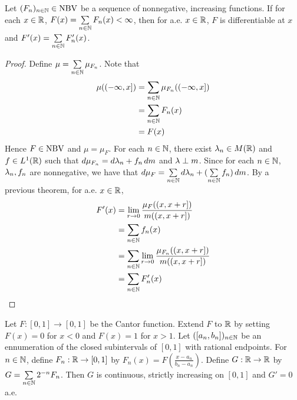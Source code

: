 \documentclass{book}
\begin{document}
	\begin{ex}  
		Let $(F_n)_{n\in \mathbb{N}} \in \text{NBV}$ be a sequence of nonnegative, increasing functions. If for each $x \in \mathbb{R}$, $F(x)=\sum\limits_{n \in \mathbb{N}}F_n(x)< \infty$, then for a.e. $x \in \mathbb{R}$, $F$ is differentiable at $x$ and $F'(x) = \sum\limits_{n\in \mathbb{N}}F_n'(x)$. 
	\end{ex}
	
	\begin{proof}
		
		Define $\mu = \sum\limits_{n \in \mathbb{N}}\mu_{F_n}$. Note that 
		\begin{align*}
			\mu((-\infty,x]) 
			&= \sum\limits_{n \in \mathbb{N}}\mu_{F_n}((-\infty,x]) \\
			&= \sum\limits_{n \in \mathbb{N}}F_n(x)\\
			&= F(x)
		\end{align*}
		Hence $F \in \text{NBV}$ and $\mu=\mu_F$. For each $n \in \mathbb{N}$, there exist $\lambda_n \in M(\mathbb{R})$ and $f \in L^1(\mathbb{R})$ such that $d\mu_{F_n} = d\lambda_n + f_n\, d m$ and $\lambda \perp m$. Since for each $n \in \mathbb{N}$, $\lambda_n, f_n$ are nonnegative, we have that $d\mu_F =  \sum\limits_{n \in \mathbb{N}} d\lambda_n + (\sum\limits_{n \in \mathbb{N}}f_n)\, d m$. By a previous theorem, for a.e. $x \in \mathbb{R}$, 
		\begin{align*}
			F'(x) 
			&= \lim_{r \rightarrow 0}\frac{\mu_F((x,x+r])}{m((x,x+r])} \\
			&= \sum\limits_{n \in \mathbb{N}}f_n(x)\\
			&= \sum\limits_{n \in \mathbb{N}}\lim_{r \rightarrow 0}\frac{\mu_{F_n}((x,x+r])}{m((x,x+r])} \\
			&= \sum\limits_{n \in \mathbb{N}}F_n'(x)
		\end{align*}
	\end{proof}
	
	\begin{ex}  
		Let $F:[0,1]\rightarrow [0, 1]$ be the Cantor function. Extend $F$ to $\mathbb{R}$ by setting $F(x) = 0$ for $x<0$ and $F(x)=1$ for $x>1$. Let $([a_n,b_n])_{n \in \mathbb{N}}$ be an ennumeration of the closed subintervals of $[0,1]$ with rational endpoints. For $n \in \mathbb{N}$, define $F_n:\mathbb{R} \rightarrow [0,1]$ by $F_n(x) = F(\frac{x-a_n}{b_n-a_n})$. Define $G:\mathbb{R} \rightarrow \mathbb{R}$ by $G = \sum\limits_{n \in \mathbb{N}}2^{-n}F_n$. Then $G$ is continuous, strictly increasing on $[0,1]$ and $G'=0$ a.e.
	\end{ex}
	
\end{document}
